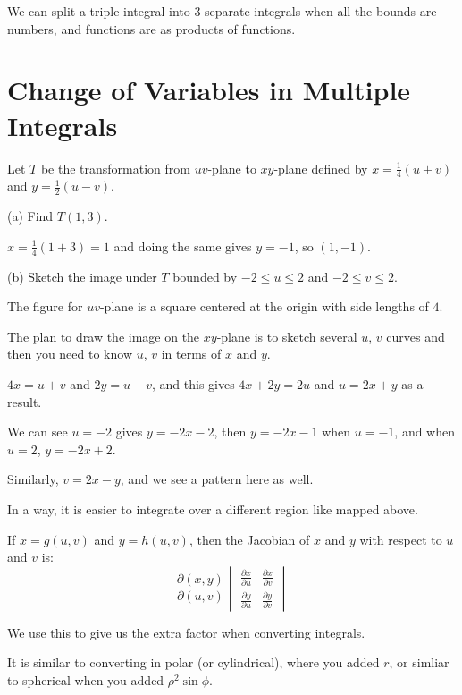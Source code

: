 \documentclass[../calc3.tex]{subfiles}
\begin{document}
We can split a triple integral into 3 separate integrals when all the bounds are numbers, and functions are as products of functions.


\section{Change of Variables in Multiple Integrals}
\begin{example}
    Let $T$ be the transformation from $uv$-plane to $xy$-plane defined by $x=\frac{1}{4}(u+v)$ and $y=\frac{1}{2}(u-v)$.

    (a) Find $T(1,3)$.

    $x=\frac{1}{4}(1+3)=1$ and doing the same gives $y=-1$, so $(1,-1)$.

    (b) Sketch the image under $T$ bounded by $-2\leq u\leq 2$ and $-2\leq v\leq 2$.

    The figure for $uv$-plane is a square centered at the origin with side lengths of $4$.

    The plan to draw the image on the $xy$-plane is to sketch several $u$, $v$ curves and then you need to know $u$, $v$ in terms of $x$ and $y$.

    $4x=u+v$ and $2y=u-v$, and this gives $4x+2y=2u$ and $u=2x+y$ as a result.

    We can see $u=-2$ gives $y=-2x-2$, then $y=-2x-1$ when $u=-1$, and when $u=2$, $y=-2x+2$.
    
    Similarly, $v=2x-y$, and we see a pattern here as well.
\end{example}

In a way, it is easier to integrate over a different region like mapped above.

\begin{definition}[Jacobian]
    If $x=g(u,v)$ and $y=h(u,v)$, then the Jacobian of $x$ and $y$ with respect to $u$ and $v$ is: 
    \[ \frac{\partial (x,y)}{\partial (u,v)}\begin{vmatrix}
        \frac{\partial x}{\partial u}& \frac{\partial x}{\partial v} \\
        \frac{\partial y}{\partial u}& \frac{\partial y}{\partial v}
    \end{vmatrix} \]
\end{definition}

We use this to give us the extra factor when converting integrals.

It is similar to converting in polar (or cylindrical), where you added $r$, or simliar to spherical when you added $\rho^2 \sin\phi$.
\end{document}
